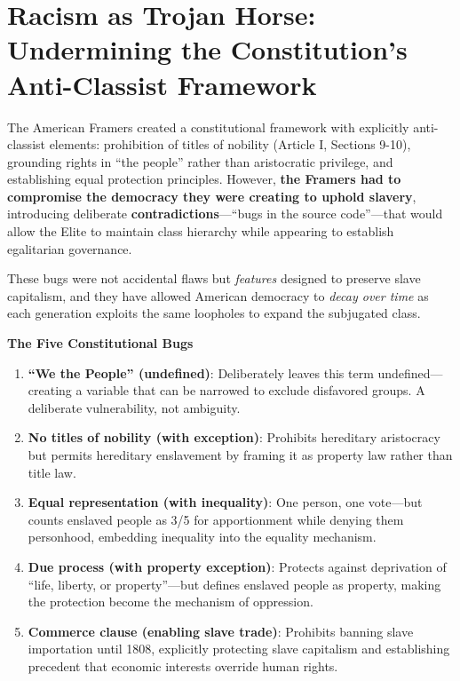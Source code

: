 \documentclass[12pt,openany]{book}
\begin{document}
\section{Racism as Trojan Horse: Undermining the Constitution's Anti-Classist Framework}

The American Framers created a constitutional framework with explicitly anti-classist elements: prohibition of titles of nobility (Article I, Sections 9-10), grounding rights in ``the people'' rather than aristocratic privilege, and establishing equal protection principles. However, \textbf{the Framers had to compromise the democracy they were creating to uphold slavery}, introducing deliberate \textbf{contradictions}---``bugs in the source code''---that would allow the Elite to maintain class hierarchy while appearing to establish egalitarian governance.

These bugs were not accidental flaws but \textit{features} designed to preserve slave capitalism, and they have allowed American democracy to \textit{decay over time} as each generation exploits the same loopholes to expand the subjugated class.

\textbf{The Five Constitutional Bugs}

\begin{enumerate}
    \item \textbf{``We the People'' (undefined)}: Deliberately leaves this term undefined---creating a variable that can be narrowed to exclude disfavored groups. A deliberate vulnerability, not ambiguity.
    
    \item \textbf{No titles of nobility (with exception)}: Prohibits hereditary aristocracy but permits hereditary enslavement by framing it as property law rather than title law.
    
    \item \textbf{Equal representation (with inequality)}: One person, one vote---but counts enslaved people as 3/5 for apportionment while denying them personhood, embedding inequality into the equality mechanism.
    
    \item \textbf{Due process (with property exception)}: Protects against deprivation of ``life, liberty, or property''---but defines enslaved people as property, making the protection become the mechanism of oppression.
    
    \item \textbf{Commerce clause (enabling slave trade)}: Prohibits banning slave importation until 1808, explicitly protecting slave capitalism and establishing precedent that economic interests override human rights.
\end{enumerate}
\end{document}
